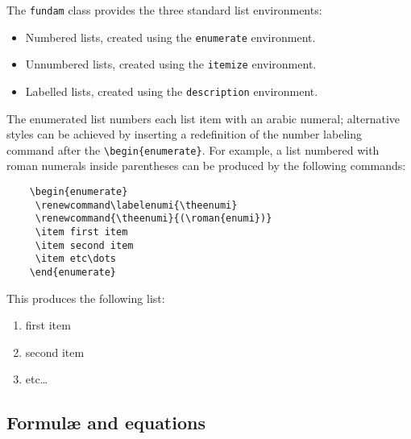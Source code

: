 \documentclass{fundam}
\begin{document}
The \texttt{fundam} class provides the three standard list
environments:
\begin{itemize}
  \item Numbered lists, created using the \texttt{enumerate}
environment.
  \item Unnumbered lists, created using the \texttt{itemize}
environment.
  \item Labelled lists, created using the \texttt{description}
environment.
\end{itemize}
The enumerated list numbers each list item with an arabic
numeral;
alternative styles can be achieved by inserting a redefinition
of the number
labeling command after the \verb!\begin{enumerate}!.
For example, a list numbered with roman numerals inside
parentheses can be
produced by the following commands:
\begin{verbatim}
    \begin{enumerate}
     \renewcommand\labelenumi{\theenumi}
     \renewcommand{\theenumi}{(\roman{enumi})}
     \item first item
     \item second item
     \item etc\dots
    \end{enumerate}
\end{verbatim}
This produces the following list:
\begin{enumerate}
  \renewcommand\labelenumi{\theenumi}
  \renewcommand{\theenumi}{(\roman{enumi})}
  \item first item
  \item second item
  \item etc\dots
\end{enumerate}

\subsection{Formul{\ae} and equations}
\end{document}
